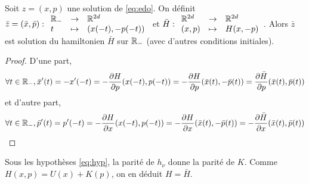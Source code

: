 \documentclass[10pt,a4paper]{article}
\begin{document}
\begin{Lem}\label{lem:sol-inverse}
	Soit $z = (x,p)$ une solution de \eqref{eq:edo}. On définit $\bar{z} = (\bar x, \bar p) : { \begin{array}{lcl} \mathbb{R}_{-} & \to & \mathbb{R}^{2d} \\ t & \mapsto & (x(-t), -p(-t)) \end{array} }$ et $\bar H : { \begin{array}{lcl} \mathbb{R}^{2d} & \to & \mathbb{R}^{2d} \\ (x,p) & \mapsto & H(x,-p) \end{array} }$. Alors $\bar{z}$ est solution du hamiltonien $\bar H$ sur $\mathbb{R}_{-}$ (avec d'autres conditions initiales).
\end{Lem}
\begin{proof}
	D'une part,
	$$
	\forall t \in \mathbb{R}_-, \bar x'(t) = - x'(-t) = - \frac{\partial H}{\partial p}(x(-t),p(-t)) = - \frac{\partial H}{\partial p}(\bar x(t), - \bar p(t)) = \frac{\partial{\bar H}}{\partial p}(\bar x(t), \bar p(t))
	$$
	et d'autre part,
	$$
	\forall t \in \mathbb{R}_-, \bar p'(t) = p'(-t) = - \frac{\partial H}{\partial x}(x(-t),p(-t)) = - \frac{\partial H}{\partial x}(\bar x(t), - \bar p(t)) = - \frac{\partial{\bar H}}{\partial x}(\bar x(t), \bar p(t))
	$$
\end{proof}

\begin{Rque}\label{rque:Hbar}
	Sous les hypothèses \eqref{eq:hyp}, la parité de $h_\nu$ donne la parité de $K$. Comme $H(x,p) = U(x)+K(p)$, on en déduit $H = \bar H$.
\end{Rque}
\end{document}
